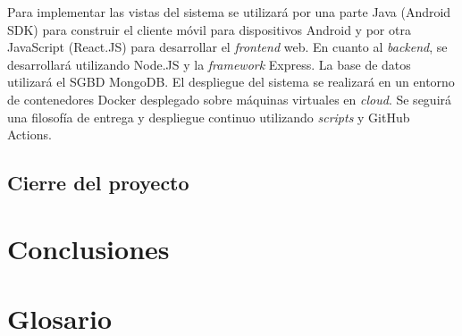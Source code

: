 \documentclass{article}
\begin{document}
Para implementar las vistas del sistema se utilizará por una parte Java (Android SDK) para construir el cliente móvil para dispositivos Android y por otra JavaScript (React.JS) para desarrollar el \textit{frontend} web. En cuanto al \textit{backend}, se desarrollará utilizando Node.JS y la \textit{framework} Express. La base de datos utilizará el SGBD MongoDB. El despliegue del sistema se realizará en un entorno de contenedores Docker desplegado sobre máquinas virtuales en \textit{cloud}. Se seguirá una filosofía de entrega y despliegue continuo utilizando \textit{scripts} y GitHub Actions.

\subsection{Cierre del proyecto}

\section*{Conclusiones}

\section*{Glosario}
\end{document}
